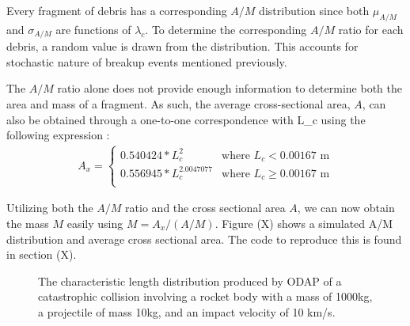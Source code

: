 \documentclass[a4paper, 12pt]{article}
\begin{document}
Every fragment of debris has a corresponding $A/M$ distribution since both $\mu_{A/M}$ and $\sigma_{A/M}$ are functions of $\lambda_c$. To determine the corresponding $A/M$ ratio for each debris, a random value is drawn from the distribution. This accounts for stochastic nature of breakup events mentioned previously. 

The $A/M$ ratio alone does not provide enough information to determine both the area and mass of a fragment. As such, the average cross-sectional area, $A$, can also be obtained through a one-to-one correspondence with \Gls{L_c} using the following expression \citep{johnson_nasas_2001}:
\begin{align}
	A_x = \begin{cases}
		0.540424 * L_c^2 & \text{where } L_c < 0.00167 \text{ m} \\
		0.556945 * L_c^{2.0047077} & \text{where } L_c \geq 0.00167 \text{ m} \\
	\end{cases}
\end{align}

Utilizing both the $A/M$ ratio and the cross sectional area $A$, we can now obtain the mass $M$ easily using
$M = A_x / (A/M)$.
Figure (X)  shows a simulated A/M distribution and average cross sectional area. The code to reproduce this is found in section (X).
\begin{figure}[H]
	\begin{adjustbox}{max width=1\linewidth,center}
		\centering     %
	\end{adjustbox}
	\caption{The characteristic length distribution produced by ODAP of a catastrophic collision involving a rocket body with a mass of 1000kg, a projectile of mass 10kg, and an impact velocity of 10 km/s. }
\end{figure}
\end{document}
